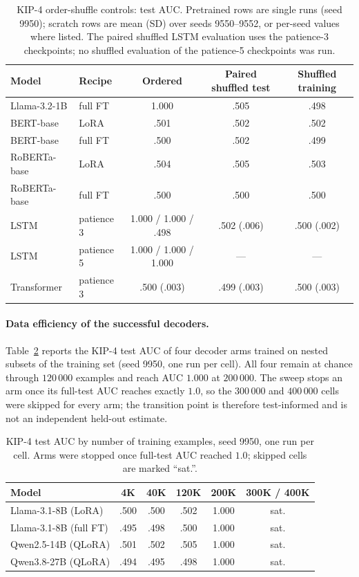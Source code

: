 \documentclass{article} %
\theoremstyle{plain}
\theoremstyle{definition}
\theoremstyle{remark}
\begin{document}
\begin{table}[h]
\centering\small
\caption{KIP-4 order-shuffle controls: test AUC. Pretrained rows are single runs (seed 9950); scratch rows are mean (SD) over seeds 9550--9552, or per-seed values where listed. The paired shuffled LSTM evaluation uses the patience-3 checkpoints; no shuffled evaluation of the patience-5 checkpoints was run.}
\label{tab:kip_shuffle}
\begin{tabular}{@{}llccc@{}}
\toprule
Model & Recipe & Ordered & Paired shuffled test & Shuffled training \\
\midrule
Llama-3.2-1B & full FT & 1.000 & .505 & .498 \\
BERT-base & LoRA & .501 & .502 & .502 \\
BERT-base & full FT & .500 & .502 & .499 \\
RoBERTa-base & LoRA & .504 & .505 & .503 \\
RoBERTa-base & full FT & .500 & .500 & .500 \\
LSTM & patience 3 & 1.000 / 1.000 / .498 & .502 (.006) & .500 (.002) \\
LSTM & patience 5 & 1.000 / 1.000 / 1.000 & --- & --- \\
Transformer & patience 3 & .500 (.003) & .499 (.003) & .500 (.003) \\
\bottomrule
\end{tabular}
\end{table}

\paragraph{Data efficiency of the successful decoders.}
Table~\ref{tab:kip_data_efficiency} reports the KIP-4 test AUC of four decoder arms trained on nested subsets of the training set (seed 9950, one run per cell). All four remain at chance through $120\,000$ examples and reach AUC $1.000$ at $200\,000$. The sweep stops an arm once its full-test AUC reaches exactly $1.0$, so the $300\,000$ and $400\,000$ cells were skipped for every arm; the transition point is therefore test-informed and is not an independent held-out estimate.

\begin{table}[h]
\centering\small
\caption{KIP-4 test AUC by number of training examples, seed 9950, one run per cell. Arms were stopped once full-test AUC reached $1.0$; skipped cells are marked ``sat.''.}
\label{tab:kip_data_efficiency}
\begin{tabular}{@{}lccccc@{}}
\toprule
Model & 4K & 40K & 120K & 200K & 300K / 400K \\
\midrule
Llama-3.1-8B (LoRA) & .500 & .500 & .502 & 1.000 & sat. \\
Llama-3.1-8B (full FT) & .495 & .498 & .500 & 1.000 & sat. \\
Qwen2.5-14B (QLoRA) & .501 & .502 & .505 & 1.000 & sat. \\
Qwen3.8-27B (QLoRA) & .494 & .495 & .498 & 1.000 & sat. \\
\bottomrule
\end{tabular}
\end{table}
\end{document}
